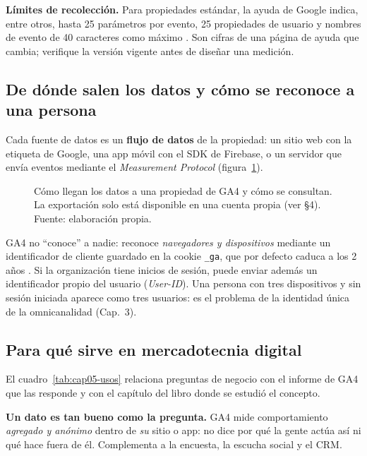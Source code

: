 \begin{cajaAtencion}
\textbf{Límites de recolección.} Para propiedades estándar, la ayuda de Google
indica, entre otros, hasta 25 parámetros por evento, 25 propiedades de usuario
y nombres de evento de 40 caracteres como máximo
\parencite{google2026ga4limites}. Son cifras de una página de ayuda que
cambia; verifique la versión vigente antes de diseñar una medición.
\end{cajaAtencion}

\subsection{De dónde salen los datos y cómo se reconoce a una persona}

Cada fuente de datos es un \textbf{flujo de datos} de la propiedad: un sitio
web con la etiqueta de Google, una app móvil con el SDK de Firebase, o un
servidor que envía eventos mediante el \textit{Measurement Protocol}
(figura~\ref{fig:cap05-flujo}).

\begin{figure}[!htb]
  \centering
  \resizebox{0.94\textwidth}{!}{}
  \caption{Cómo llegan los datos a una propiedad de GA4 y cómo se consultan.
  La exportación solo está disponible en una cuenta propia (ver §4). Fuente:
  elaboración propia.}
  \label{fig:cap05-flujo}
\end{figure}

GA4 no \enquote{conoce} a nadie: reconoce \emph{navegadores y dispositivos}
mediante un identificador de cliente guardado en la cookie \texttt{\_ga}, que
por defecto caduca a los 2 años \parencite{google2026ga4cookies}. Si la
organización tiene inicios de sesión, puede enviar además un identificador
propio del usuario (\textit{User-ID}). Una persona con tres dispositivos y sin
sesión iniciada aparece como tres usuarios: es el problema de la identidad
única de la omnicanalidad (Cap.~3).

\subsection{Para qué sirve en mercadotecnia digital}

El cuadro~\ref{tab:cap05-usos} relaciona preguntas de negocio con el informe
de GA4 que las responde y con el capítulo del libro donde se estudió el
concepto.

\begin{cajaFrontera}
\textbf{Un dato es tan bueno como la pregunta.} GA4 mide comportamiento
\emph{agregado y anónimo} dentro de \emph{su} sitio o app: no dice por qué la
gente actúa así ni qué hace fuera de él. Complementa a la encuesta, la escucha
social y el CRM.
\end{cajaFrontera}

